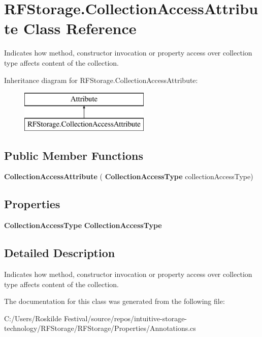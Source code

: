 \section{R\+F\+Storage.\+Collection\+Access\+Attribute Class Reference}
\label{class_r_f_storage_1_1_collection_access_attribute}


Indicates how method, constructor invocation or property access over collection type affects content of the collection.  


Inheritance diagram for R\+F\+Storage.\+Collection\+Access\+Attribute\+:\begin{figure}[H]
\begin{center}
\leavevmode
\includegraphics[height=2.000000cm]{class_r_f_storage_1_1_collection_access_attribute}
\end{center}
\end{figure}
\subsection*{Public Member Functions}
\begin{DoxyCompactItemize}
\item 
\mbox{\label{class_r_f_storage_1_1_collection_access_attribute_a6cbba8fe669928244a15f3ea856184d5}} 
{\bfseries Collection\+Access\+Attribute} (\textbf{ Collection\+Access\+Type} collection\+Access\+Type)
\end{DoxyCompactItemize}
\subsection*{Properties}
\begin{DoxyCompactItemize}
\item 
\mbox{\label{class_r_f_storage_1_1_collection_access_attribute_abfa3691fb506d1866b0b5d07260ac74e}} 
\textbf{ Collection\+Access\+Type} {\bfseries Collection\+Access\+Type}\hspace{0.3cm}{\ttfamily  [get]}
\end{DoxyCompactItemize}


\subsection{Detailed Description}
Indicates how method, constructor invocation or property access over collection type affects content of the collection. 



The documentation for this class was generated from the following file\+:\begin{DoxyCompactItemize}
\item 
C\+:/\+Users/\+Roskilde Festival/source/repos/intuitive-\/storage-\/technology/\+R\+F\+Storage/\+R\+F\+Storage/\+Properties/Annotations.\+cs\end{DoxyCompactItemize}
